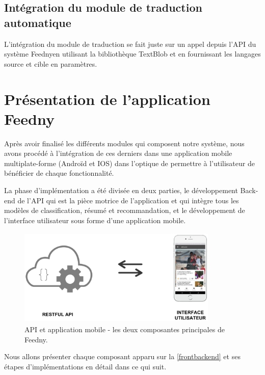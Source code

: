 \subsection{Intégration du module de traduction automatique}
L'intégration du module de traduction se fait juste sur un appel depuis l'API du système \textquotedbl Feedny\textquotedbl en utilisant la bibliothèque TextBlob et en fournissant les langages source et cible en paramètres.


\section{Présentation de l'application \textquotedbl Feedny\textquotedbl}
Après avoir finalisé les différents modules qui composent notre système, nous avons procédé à l'intégration de ces derniers dans une application mobile multiplate-forme (Androïd et IOS) dans l'optique de permettre à l'utilisateur de bénéficier de chaque fonctionnalité.

La phase d'implémentation a été divisée en deux parties, le développement Back-end de l'API qui est la pièce motrice de l'application et qui intègre tous les modèles de classification, résumé et recommandation, et le développement de l'interface utilisateur sous forme d'une application mobile.

\begin{figure}[H]
    \centering
    \includegraphics[height=132pt,width=270pt]{img/chapter4/frontbackend.png}
    \caption{API et application mobile - les deux composantes principales de \textquotedbl Feedny\textquotedbl. }
    \label{frontbackend}
\end{figure}

Nous allons présenter chaque composant apparu sur la \autoref{frontbackend} et ses étapes d'implémentations en détail dans ce qui suit.

